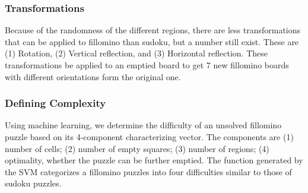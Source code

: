 \subsubsection{Transformations}
Because of the randomness of the different regions, there are less
transformations that can be applied to fillomino than sudoku, but a
number still exist. These are (1) Rotation, (2) Vertical reflection, and (3) Horizontal reflection. These transformations be applied to an emptied board to get 7 new fillomino boards with different orientations form the original one.

\subsubsection{Defining Complexity}
Using machine learning, we determine the difficulty of an unsolved
fillomino puzzle based on its 4-component characterizing vector. The components are (1) number of cells; (2) number of empty squares; (3) number of regions; (4) optimality, whether the puzzle can be further emptied. The function generated by the SVM categorizes a fillomino puzzles into four difficulties similar to those of sudoku puzzles.

